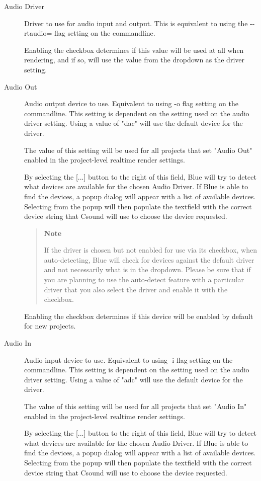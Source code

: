 \begin{description}
\item[Audio Driver]
Driver to use for audio input and output. This is equivalent to using
the -\/-rtaudio= flag setting on the commandline.

Enabling the checkbox determines if this value will be used at all when
rendering, and if so, will use the value from the dropdown as the driver
setting.
\item[Audio Out]
Audio output device to use. Equivalent to using -o flag setting on the
commandline. This setting is dependent on the setting used on the audio
driver setting. Using a value of "dac" will use the default device for
the driver.

The value of this setting will be used for all projects that set "Audio
Out" enabled in the project-level realtime render settings.

By selecting the {[}...{]} button to the right of this field, Blue will
try to detect what devices are available for the chosen Audio Driver. If
Blue is able to find the devices, a popup dialog will appear with a list
of available devices. Selecting from the popup will then populate the
textfield with the correct device string that Csound will use to choose
the device requested.

\begin{quote}
\textbf{Note}

If the driver is chosen but not enabled for use via its checkbox, when
auto-detecting, Blue will check for devices against the default driver
and not necessarily what is in the dropdown. Please be sure that if you
are planning to use the auto-detect feature with a particular driver
that you also select the driver and enable it with the checkbox.
\end{quote}

Enabling the checkbox determines if this device will be enabled by
default for new projects.
\item[Audio In]
Audio input device to use. Equivalent to using -i flag setting on the
commandline. This setting is dependent on the setting used on the audio
driver setting. Using a value of "adc" will use the default device for
the driver.

The value of this setting will be used for all projects that set "Audio
In" enabled in the project-level realtime render settings.

By selecting the {[}...{]} button to the right of this field, Blue will
try to detect what devices are available for the chosen Audio Driver. If
Blue is able to find the devices, a popup dialog will appear with a list
of available devices. Selecting from the popup will then populate the
textfield with the correct device string that Csound will use to choose
the device requested.


\end{description}

